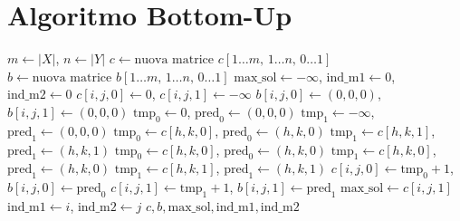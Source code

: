 \section{Algoritmo Bottom-Up}
\begin{algorithm}[htbp]
\caption{Calcolo Bottom-Up per LCS con 2 elementi rossi consecutivi}
\begin{algorithmic}[1]
    \State $m \gets |X|$, $n \gets |Y|$
    \State $c \gets \text{nuova matrice } c[1 \dots m, \, 1 \dots n, \, 0 \dots 1]$
    \State $b \gets \text{nuova matrice } b[1 \dots m, \, 1 \dots n, \, 0 \dots 1]$
    \State $\text{max\_sol} \gets -\infty$, $\text{ind\_m1} \gets 0$, $\text{ind\_m2} \gets 0$
                \State $c[i, j, 0] \gets 0$, $c[i, j, 1] \gets -\infty$
                \State $b[i, j, 0] \gets (0, 0, 0)$, $b[i, j, 1] \gets (0, 0, 0)$
            \Else
                \State $\text{tmp}_0 \gets 0$, $\text{pred}_0 \gets (0, 0, 0)$
                \State $\text{tmp}_1 \gets -\infty$, $\text{pred}_1 \gets (0, 0, 0)$
                                    \State $\text{tmp}_0 \gets c[h, k, 0]$, $\text{pred}_0 \gets (h, k, 0)$
                                \EndIf
                                    \State $\text{tmp}_1 \gets c[h, k, 1]$, $\text{pred}_1 \gets (h, k, 1)$
                                \EndIf
                            \Else
                                    \State $\text{tmp}_0 \gets c[h, k, 0]$, $\text{pred}_0 \gets (h, k, 0)$
                                \EndIf
                                    \State $\text{tmp}_1 \gets c[h, k, 0]$, $\text{pred}_1 \gets (h, k, 0)$
                                \EndIf
                                    \State $\text{tmp}_1 \gets c[h, k, 1]$, $\text{pred}_1 \gets (h, k, 1)$
                                \EndIf
                            \EndIf
                        \EndIf
                    \EndFor
                \EndFor
                \State $c[i, j, 0] \gets \text{tmp}_0 + 1$, $b[i, j, 0] \gets \text{pred}_0$
                \State $c[i, j, 1] \gets \text{tmp}_1 + 1$, $b[i, j, 1] \gets \text{pred}_1$
                    \State $\text{max\_sol} \gets c[i, j, 1]$
                    \State $\text{ind\_m1} \gets i$, $\text{ind\_m2} \gets j$
                \EndIf
            \EndIf
        \EndFor
    \EndFor
    \State \Return $c, b, \text{max\_sol}, \text{ind\_m1}, \text{ind\_m2}$
\EndProcedure
\end{algorithmic}
\end{algorithm}

